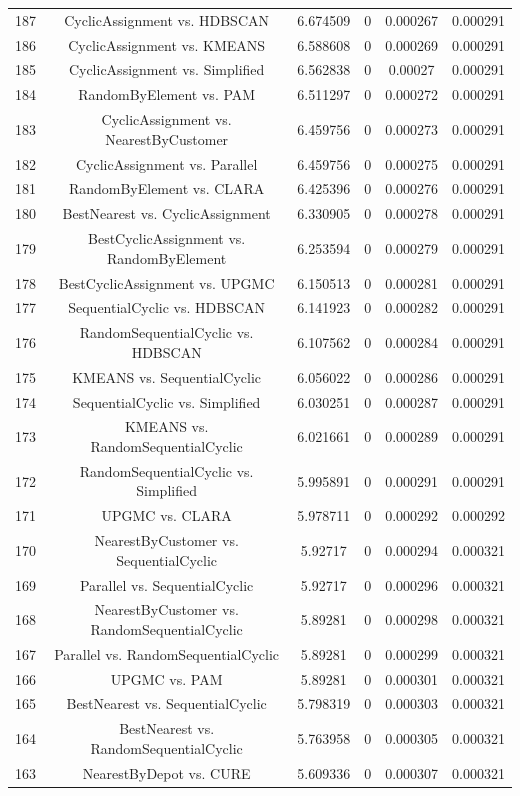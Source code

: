 \documentclass[a4paper,10pt]{article}
\begin{document}
\begin{landscape}
\begin{table}[!htp]
\begin{tabular}{cccccc}
187&CyclicAssignment vs. HDBSCAN&6.674509&0&0.000267&0.000291\\
186&CyclicAssignment vs. KMEANS&6.588608&0&0.000269&0.000291\\
185&CyclicAssignment vs. Simplified&6.562838&0&0.00027&0.000291\\
184&RandomByElement vs. PAM&6.511297&0&0.000272&0.000291\\
183&CyclicAssignment vs. NearestByCustomer&6.459756&0&0.000273&0.000291\\
182&CyclicAssignment vs. Parallel&6.459756&0&0.000275&0.000291\\
181&RandomByElement vs. CLARA&6.425396&0&0.000276&0.000291\\
180&BestNearest vs. CyclicAssignment&6.330905&0&0.000278&0.000291\\
179&BestCyclicAssignment vs. RandomByElement&6.253594&0&0.000279&0.000291\\
178&BestCyclicAssignment vs. UPGMC&6.150513&0&0.000281&0.000291\\
177&SequentialCyclic vs. HDBSCAN&6.141923&0&0.000282&0.000291\\
176&RandomSequentialCyclic vs. HDBSCAN&6.107562&0&0.000284&0.000291\\
175&KMEANS vs. SequentialCyclic&6.056022&0&0.000286&0.000291\\
174&SequentialCyclic vs. Simplified&6.030251&0&0.000287&0.000291\\
173&KMEANS vs. RandomSequentialCyclic&6.021661&0&0.000289&0.000291\\
172&RandomSequentialCyclic vs. Simplified&5.995891&0&0.000291&0.000291\\
171&UPGMC vs. CLARA&5.978711&0&0.000292&0.000292\\
170&NearestByCustomer vs. SequentialCyclic&5.92717&0&0.000294&0.000321\\
169&Parallel vs. SequentialCyclic&5.92717&0&0.000296&0.000321\\
168&NearestByCustomer vs. RandomSequentialCyclic&5.89281&0&0.000298&0.000321\\
167&Parallel vs. RandomSequentialCyclic&5.89281&0&0.000299&0.000321\\
166&UPGMC vs. PAM&5.89281&0&0.000301&0.000321\\
165&BestNearest vs. SequentialCyclic&5.798319&0&0.000303&0.000321\\
164&BestNearest vs. RandomSequentialCyclic&5.763958&0&0.000305&0.000321\\
163&NearestByDepot vs. CURE&5.609336&0&0.000307&0.000321\\

\end{tabular}
\end{table}
\end{landscape}
\end{document}
